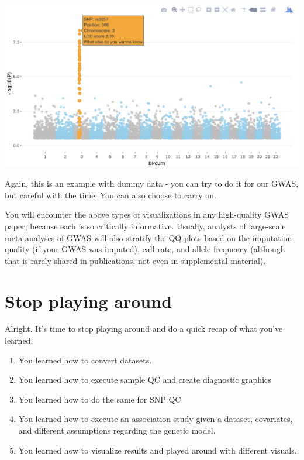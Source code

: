 \documentclass[
]{book}
\providecommand{\tightlist}{%
  \setlength{\itemsep}{0pt}\setlength{\parskip}{0pt}}
\begin{document}
\includegraphics{img/_gwas/interactive plot.png}

Again, this is an example with dummy data - you can try to do it for our GWAS, but careful with the time. You can also choose to carry on.

You will encounter the above types of visualizations in any high-quality GWAS paper, because each is so critically informative. Usually, analysts of large-scale meta-analyses of GWAS will also stratify the QQ-plots based on the imputation quality (if your GWAS was imputed), call rate, and allele frequency (although that is rarely shared in publications, not even in supplemental material).

\hypertarget{stop-playing-around}{%
\section{Stop playing around}\label{stop-playing-around}}

Alright. It's time to stop playing around and do a quick recap of what you've learned.

\begin{enumerate}
\def\labelenumi{\arabic{enumi}.}
\tightlist
\item
  You learned how to convert datasets.
\item
  You learned how to execute sample QC and create diagnostic graphics
\item
  You learned how to do the same for SNP QC
\item
  You learned how to execute an association study given a dataset, covariates, and different assumptions regarding the genetic model.
\item
  You learned how to visualize results and played around with different visuals.
\end{enumerate}
\end{document}
